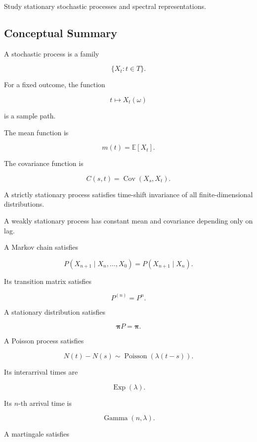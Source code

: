 \begin{exercise}[4]
Study stationary stochastic processes and spectral representations.
\end{exercise}

\subsection{Conceptual Summary}
\label{subsec:stochastic-process-summary}

A stochastic process is a family

\[
\boxed{
\{X_t:t\in T\}.
}
\]

For a fixed outcome, the function

\[
\boxed{
t\mapsto X_t(\omega)
}
\]

is a sample path.

The mean function is

\[
\boxed{
m(t)
=
\mathbb{E}[X_t].
}
\]

The covariance function is

\[
\boxed{
C(s,t)
=
\operatorname{Cov}(X_s,X_t).
}
\]

A strictly stationary process satisfies time-shift invariance of all
finite-dimensional distributions.

A weakly stationary process has constant mean and covariance depending
only on lag.

A Markov chain satisfies

\[
\boxed{
P(X_{n+1}\mid X_n,\ldots,X_0)
=
P(X_{n+1}\mid X_n).
}
\]

Its transition matrix satisfies

\[
\boxed{
P^{(n)}=P^n.
}
\]

A stationary distribution satisfies

\[
\boxed{
\boldsymbol{\pi}P
=
\boldsymbol{\pi}.
}
\]

A Poisson process satisfies

\[
\boxed{
N(t)-N(s)
\sim
\operatorname{Poisson}
(
\lambda(t-s)
).
}
\]

Its interarrival times are

\[
\boxed{
\operatorname{Exp}(\lambda).
}
\]

Its \(n\)-th arrival time is

\[
\boxed{
\operatorname{Gamma}(n,\lambda).
}
\]

A martingale satisfies

